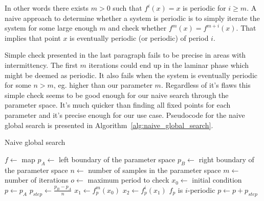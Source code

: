 In other words there exists $m > 0$ such that $f^{i}(x)=x$ is periodic for $i \geq m$.
A naive approach to determine whether a system is periodic is to simply iterate the system for some large enough $m$ and check whether $f^{m}(x)=f^{m+i}(x)$.
That implies that point $x$ is eventually periodic (or periodic) of period $i$.
\par
Simple check presented in the last paragraph fails to be precise in areas with intermittency.
The first $m$ iterations could end up in the laminar phase which might be deemed as periodic.
It also fails when the system is eventually periodic for some $n > m$, eg. higher than our parameter $m$.
Regardless of it's flaws this simple check seems to be good enough for our naive search through the parameter space.
It's much quicker than finding all fixed points for each parameter and it's precise enough for our use case.
Pseudocode for the naive global search is presented in Algorithm~\ref{alg:naive_global_search}.

\begin{algorithm}[!h]
    \caption{Naive global search}
    \label{alg:naive_global_search}
    \begin{algorithmic}[1]
        \Statex $f \gets$ map
        \Statex $p_{A} \gets$ left boundary of the parameter space
        \Statex $p_{B} \gets$ right boundary of the parameter space
        \Statex $n \gets$ number of samples in the parameter space
        \Statex $m \gets$ number of iterations
        \Statex $o \gets$ maximum period to check
        \Statex $x_0 \gets$ initial condition
        \State $p \gets p_{A}$
        \State $p_{step} \gets \frac{p_{B} - p_{A}}{n}$
            \State $x_1 \gets f_{p}^{m}(x_0)$
                \State $x_2 \gets f_{p}^{i}(x_1)$
                    \State $f_p$ is $i$-periodic
                \EndIf
            \EndFor
            \State $p \gets p + p_{step}$
        \EndWhile
    \end{algorithmic}
\end{algorithm}

